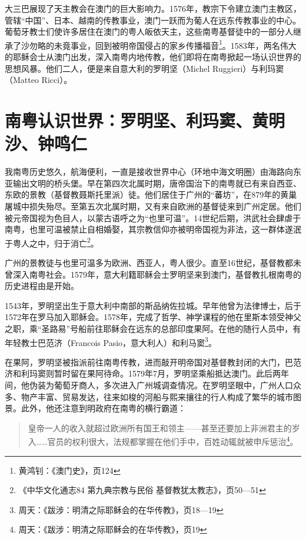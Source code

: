 大三巴展现了天主教会在澳门的巨大影响力。1576年，教宗下令建立澳门主教区，管辖“中国”、日本、越南的传教事业，澳门一跃而为葡人在远东传教事业的中心。葡萄牙教士们使许多居住在澳门的粤人皈依天主，这些南粤基督徒中的一部分人继承了沙勿略的未竟事业，回到被明帝国侵占的家乡传播福音\footnote{黄鸿钊：《澳门史》，页124}。1583年，两名伟大的耶稣会士从澳门出发，深入南粤内地传教，他们即将在南粤掀起一场认识世界的思想风暴。他们二人，便是来自意大利的罗明坚（Michel Ruggieri）与利玛窦（Matteo Ricci）。

\section{南粤认识世界：罗明坚、利玛窦、黄明沙、钟鸣仁}


\indent 我南粤历史悠久，航海便利，一直是接收世界中心（环地中海文明圈）由海路向东亚输出文明的桥头堡。早在第四次北属时期，唐帝国治下的南粤就已有来自西亚、东欧的景教（基督教聂斯托里派）徒。他们居住于广州的“蕃坊”，在879年的黄巢屠城中损失殆尽。至第五次北属时期，又有来自欧洲的基督徒来到广州定居。他们被元帝国视为色目人，以蒙古语呼之为“也里可温”。14世纪后期，洪武社会肆虐于南粤，也里可温被禁止自相婚娶，其宗教信仰亦被明帝国视为非法，这一群体遂泯于粤人之中，归于消亡\footnote{《中华文化通志84 第九典宗教与民俗 基督教犹太教志》，页50—51}。

广州的景教徒与也里可温多为欧洲、西亚人，粤人很少。直至16世纪，基督教都未曾深入南粤社会。1579年，意大利籍耶稣会士罗明坚来到澳门，基督教扎根南粤的历史进程由是开始。

1543年，罗明坚出生于意大利中南部的斯品纳佐拉城。早年他曾为法律博士，后于1572年在罗马加入耶稣会。1578年，完成了哲学、神学课程的他在里斯本领受神父之职，乘“圣路易”号船前往耶稣会在远东的总部印度果阿。在他的随行人员中，有年轻教士巴范济（Francois Pasio，意大利人）和利马窦\footnote{周天：《跋涉：明清之际耶稣会的在华传教》，页18—19}。

在果阿，罗明坚被指派前往南粤传教，进而敲开明帝国对基督教封闭的大门，巴范济和利玛窦则暂时留在果阿待命。1579年7月，罗明坚乘船抵达澳门。此后两年间，他伪装为葡萄牙商人，多次进入广州城调查情况。在罗明坚眼中，广州人口众多、物产丰富、贸易发达，往来如梭的河船与熙来攘往的行人构成了繁华的城市图景。此外，他还注意到明政府在南粤的横行霸道：

\begin{quote}

皇帝一人的收入就超过欧洲所有国王和领主——甚至还要加上非洲君主的岁入……官员的权利很大，法规都掌握在他们手中，百姓动辄就被申斥惩治\footnote{周天：《跋涉：明清之际耶稣会的在华传教》，页19}。

\end{quote}

